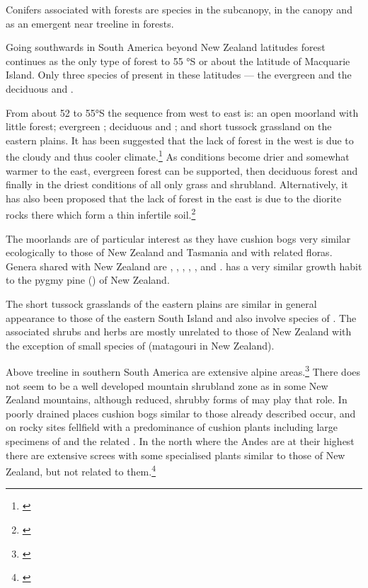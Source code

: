 Conifers associated with  forests are  species in the subcanopy,  in the canopy and  as an emergent near treeline in  forests.

Going southwards in South America beyond New Zealand latitudes  forest continues as the only type of forest to 55 °S or about the latitude of Macquarie Island.
Only three species of  present in these latitudes — the evergreen  and the deciduous  and .

From about 52 to 55°S the sequence from west to east is: an open moorland with little forest; evergreen ; deciduous  and ; and short tussock grassland on the eastern plains.
It has been suggested that the lack of forest in the west is due to the cloudy and thus cooler climate.\footnote{\cite{mcqueen1976ecology}}
As conditions become drier and somewhat warmer to the east, evergreen  forest can be supported, then deciduous  forest and finally in the driest conditions of all only grass and shrubland.
Alternatively, it has also been proposed that the lack of forest in the east is due to the diorite rocks there which form a thin infertile soil.\footnote{\cite{godley1960botany}}

The moorlands are of particular interest as they have cushion bogs very similar ecologically to those of New Zealand and Tasmania and with related floras.
Genera shared with New Zealand are , , , , ,  and .  has a very similar growth habit to the pygmy pine () of New Zealand.

The short tussock grasslands of the eastern plains are similar in general appearance to those of the eastern South Island and also involve species of .
The associated shrubs and herbs are mostly unrelated to those of New Zealand with the exception of small species of  (matagouri in New Zealand).

Above treeline in southern South America are extensive alpine areas.\footnote{\cite{moore1975alpine}}
There does not seem to be a well developed mountain shrubland zone as in some New Zealand mountains, although reduced, shrubby forms of  may play that role.
In poorly drained places cushion bogs similar to those already described occur, and on rocky sites fellfield with a predominance of cushion plants including large specimens of  and the related .
In the north where the Andes are at their highest there are extensive screes with some specialised plants similar to those of New Zealand, but not related to them.\footnote{\cite{goodspeed1950plant}}

